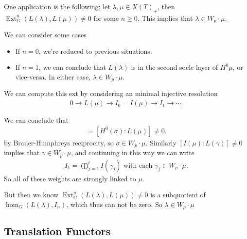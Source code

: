 \begin{remark}

\begin{remark}

One application is the following: let \(\lambda, \mu \in X(T)_+\), then
\(\operatorname{Ext}_G^n(L(\lambda), L(\mu)) \neq 0\) for some
\(n \geq 0\). This implies that \(\lambda \in W_p \cdot \mu\).

We can consider some cases

\begin{itemize}
\tightlist
\item
  If \(n=0\), we're reduced to previous situations.
\item
  If \(n=1\), we can conclude that \(L(\lambda)\) is in the second socle
  layer of \(H^0 \mu\), or vice-versa. In either case,
  \(\lambda \in W_p \cdot \mu\).
\end{itemize}

We can compute this ext by considering an minimal injective resolution
\begin{align*}   0 \to L(\mu) \to I_0 = I(\mu) \to I_1 \to \cdots .\end{align*}

We can conclude that
\begin{align*} [I(\mu) : H^0(\sigma)] = [H^0(\sigma): L(\mu)] \neq 0 .\end{align*}
by Brauer-Humphreys reciprocity, so \(\sigma \in W_p \cdot \mu\).
Similarly \([I(\mu): L(\gamma)] \neq 0\) implies that
\(\gamma \in W_p \cdot \mu\), and continuing in this way we can write
\begin{align*} I_1 = \bigoplus_{j=1}^t I(\gamma_j)  \text{ with each }  \gamma_j \in W_p \cdot \mu .\end{align*}
So all of these weights are strongly linked to \(\mu\).

But then we know \(\operatorname{Ext}_G^n (L(\lambda), L(\mu)) \neq 0\)
is a subquotient of \(\hom_G(L(\lambda), I_n)\), which thus can not be
zero. So \(\lambda \in W_p \cdot \mu\)

\end{remark}

\end{remark}

\hypertarget{translation-functors}{%
\subsection{Translation Functors}\label{translation-functors}}

